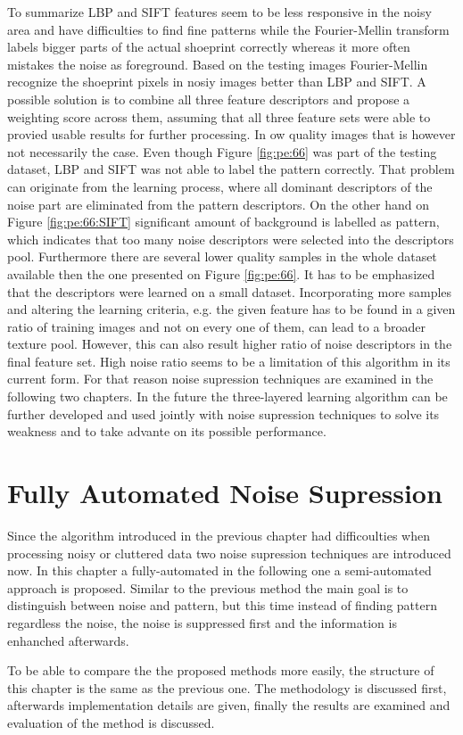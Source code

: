\documentclass[draft,final]{vutinfth} %
\begin{document}
\par
To summarize LBP and SIFT features seem to be less responsive in the noisy area and have difficulties to find fine patterns while the Fourier-Mellin transform labels bigger parts of the actual shoeprint correctly whereas it more often mistakes the noise as foreground.
Based on the testing images Fourier-Mellin recognize the shoeprint pixels in nosiy images better than LBP and SIFT.
A possible solution is to combine all three feature descriptors and propose a weighting score across them, assuming that all three feature sets were able to provied usable results for further processing.
In ow quality images that is however not necessarily the case.
Even though Figure \ref{fig:pe:66} was part of the testing dataset, LBP and SIFT was not able to label the pattern correctly.
That problem can originate from the learning process, where all dominant descriptors of the noise part are eliminated from the pattern descriptors.
On the other hand on Figure \ref{fig:pe:66:SIFT} significant amount of background is labelled as pattern, which indicates that too many noise descriptors were selected into the descriptors pool.
Furthermore there are several lower quality samples in the whole dataset available then the one presented on Figure  \ref{fig:pe:66}.
It has to be emphasized that the descriptors were learned on a small dataset.
Incorporating more samples and altering the learning criteria, e.g. the given feature has to be found in a given ratio of training images and not on every one of them, can lead to a broader texture pool.
However, this can also result higher ratio of noise descriptors in the final feature set.
High noise ratio seems to be a limitation of this algorithm in its current form.
For that reason noise supression techniques are examined in the following two chapters.
In the future the three-layered learning algorithm can be further developed and used jointly with noise supression techniques to solve its weakness and to take advante on its possible performance.

\chapter{Fully Automated Noise Supression}

Since the algorithm introduced in the previous chapter had difficoulties when processing noisy or cluttered data two noise supression techniques are introduced now.
In this chapter a fully-automated in the following one a semi-automated approach is proposed.
Similar to the previous method the main goal is to distinguish between noise and pattern, but this time instead of finding pattern regardless the noise, the noise is suppressed first and the information is enhanched afterwards.
\par
To be able to compare the the proposed methods more easily, the structure of this chapter is the same as the previous one.
The methodology is discussed first, afterwards implementation details are given, finally the results are examined and evaluation of the method is discussed.
\end{document}
